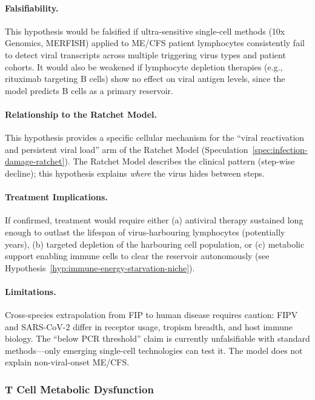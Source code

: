 \begin{hypothesis}
\paragraph{Falsifiability.}
This hypothesis would be falsified if ultra-sensitive single-cell methods (10x Genomics, MERFISH) applied to ME/CFS patient lymphocytes consistently fail to detect viral transcripts across multiple triggering virus types and patient cohorts. It would also be weakened if lymphocyte depletion therapies (e.g., rituximab targeting B cells) show no effect on viral antigen levels, since the model predicts B cells as a primary reservoir.

\paragraph{Relationship to the Ratchet Model.}
This hypothesis provides a specific cellular mechanism for the ``viral reactivation and persistent viral load'' arm of the Ratchet Model (Speculation~\ref{spec:infection-damage-ratchet}). The Ratchet Model describes the clinical pattern (step-wise decline); this hypothesis explains \emph{where} the virus hides between steps.

\paragraph{Treatment Implications.}
If confirmed, treatment would require either (a) antiviral therapy sustained long enough to outlast the lifespan of virus-harbouring lymphocytes (potentially years), (b) targeted depletion of the harbouring cell population, or (c) metabolic support enabling immune cells to clear the reservoir autonomously (see Hypothesis~\ref{hyp:immune-energy-starvation-niche}).

\paragraph{Limitations.}
Cross-species extrapolation from FIP to human disease requires caution: FIPV and SARS-CoV-2 differ in receptor usage, tropism breadth, and host immune biology. The ``below PCR threshold'' claim is currently unfalsifiable with standard methods---only emerging single-cell technologies can test it. The model does not explain non-viral-onset ME/CFS.
\end{hypothesis}

\subsubsection{T Cell Metabolic Dysfunction}

